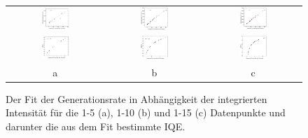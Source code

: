 \begin{figure}[H]
\begin{tabular}{ccc}
  \includegraphics[width=0.30\textwidth]{Bilder/RaumtempBilder/genfit1-10.png} & \includegraphics[width=0.30\textwidth]{Bilder/RaumtempBilder/genfit1-20.png}  & \includegraphics[width=0.30\textwidth]{Bilder/RaumtempBilder/genfit1-20.png} \\
 \includegraphics[width=0.30\textwidth]{Bilder/RaumtempBilder/iqe1-10.png} &   \includegraphics[width=0.30\textwidth]{Bilder/RaumtempBilder/iqe1-15.png} & \includegraphics[width=0.30\textwidth]{Bilder/RaumtempBilder/iqe1-20.png}  \\
 a & b & c
\end{tabular}
\caption{Der Fit der Generationsrate in Abhängigkeit der integrierten Intensität für die 1-5 (a), 1-10 (b) und 1-15 (c) Datenpunkte und darunter die aus dem Fit bestimmte IQE.}
\label{fig:raumtemp}
\end{figure}
